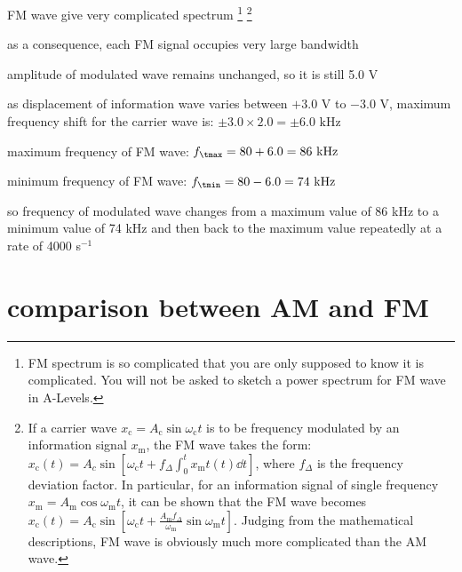 \cmt FM wave give very complicated spectrum
\footnote{FM spectrum is so complicated that you are only supposed to know it is complicated. You will not be asked to sketch a power spectrum for FM wave in A-Levels.}
\footnote{If a carrier wave $x_\text{c} = A_\text{c} \sin \omega_\text{c} t$ is to be frequency modulated by an information signal $x_\text{m}$, the FM wave takes the form: $x_\text{c}(t) = A_c \sin \left[ \omega_\text{c}t + f_\Delta \int_0^t x_\text{m}t(t) \dd t \right]$, where $f_\Delta$ is the frequency deviation factor. In particular, for an information signal of single frequency $x_\text{m} = A_\text{m} \cos\omega_\text{m} t$, it can be shown that the FM wave becomes $ x_\text{c}(t) = A_\text{c} \sin \left[\omega_\text{c} t + \frac{A_\text{m}f_\Delta}{\omega_\text{m}} \sin \omega_\text{m} t\right]$. Judging from the mathematical descriptions, FM wave is obviously much more complicated than the AM wave.}

as a consequence, each FM signal occupies very large bandwidth


\sol amplitude of modulated wave remains unchanged, so it is still 5.0 V

as displacement of information wave varies between $+3.0$ V to $-3.0$ V, maximum frequency shift for the carrier wave is: $\pm 3.0 \times 2.0 = \pm 6.0 \text{ kHz}$

maximum frequency of FM wave: $f_\tmax = 80 + 6.0 = 86 \text{ kHz}$

minimum frequency of FM wave: $f_\tmin = 80 - 6.0 = 74 \text{ kHz}$

so frequency of modulated wave changes from a maximum value of 86 kHz to a minimum value of 74 kHz and then back to the maximum value repeatedly at a rate of 4000 s$^{-1}$ \eoe




\section{comparison between AM and FM}

